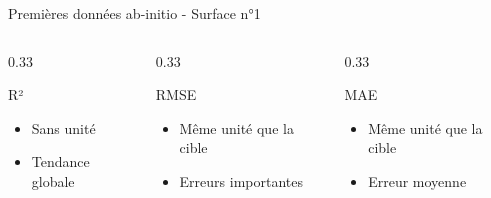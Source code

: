 \documentclass[10pt, aspectratio=169]{beamer}
\begin{document}
\begin{frame}{Premières données ab-initio - Surface n°1}
  \begin{columns}[T]
    \begin{column}{0.33\textwidth}
      \begin{exampleblock}{R²}
        \begin{itemize}
          \item Sans unité 
          \item Tendance globale
        \end{itemize}
      \end{exampleblock}
    \end{column}
    \begin{column}{0.33\textwidth}
      \begin{exampleblock}{RMSE}
        \begin{itemize}
          \item Même unité que la cible
          \item Erreurs importantes
        \end{itemize}
      \end{exampleblock}
    \end{column}
    \begin{column}{0.33\textwidth}
      \begin{exampleblock}{MAE}
        \begin{itemize}
          \item Même unité que la cible
          \item Erreur moyenne
        \end{itemize}
      \end{exampleblock}
    \end{column}
  \end{columns}

\end{frame}
\end{document}

